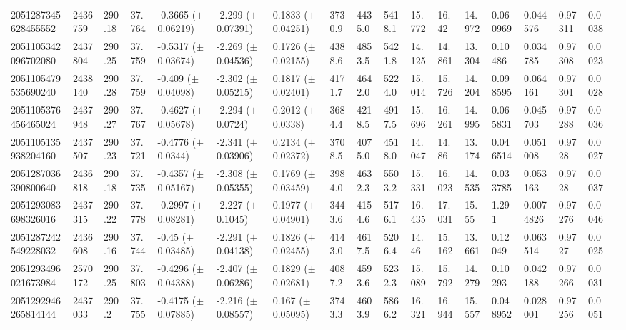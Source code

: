 \begin{sidewaystable}[htbp]
{\begin{tabular}{llllllllllllllllll}
            2051287345628455552 & 2436759 & 290.18 & 37.764 & -0.3665 ($\pm$ 0.06219) & -2.299 ($\pm$ 0.07391) & 0.1833 ($\pm$ 0.04251) & 3730.9 & 4435.0 & 5418.1 & 15.772 & 16.42 & 14.972 & 0.060969 & 0.044576 & 0.97311 & 0.0038 & \\
            2051105342096702080 & 2437804 & 290.25 & 37.759 & -0.5317 ($\pm$ 0.03674) & -2.269 ($\pm$ 0.04536) & 0.1726 ($\pm$ 0.02155) & 4388.6 & 4853.5 & 5421.8 & 14.125 & 14.861 & 13.304 & 0.10486 & 0.034785 & 0.97308 & 0.0023 & \\
            2051105479535690240 & 2438140 & 290.28 & 37.759 & -0.409 ($\pm$ 0.04098) & -2.302 ($\pm$ 0.05215) & 0.1817 ($\pm$ 0.02401) & 4171.7 & 4642.0 & 5224.0 & 15.014 & 15.726 & 14.204 & 0.098595 & 0.064161 & 0.97301 & 0.0028 & \\
            2051105376456465024 & 2437948 & 290.27 & 37.767 & -0.4627 ($\pm$ 0.05678) & -2.294 ($\pm$ 0.0724) & 0.2012 ($\pm$ 0.0338) & 3684.4 & 4218.5 & 4917.5 & 15.696 & 16.261 & 14.995 & 0.065831 & 0.045703 & 0.97288 & 0.0036 & \\
            2051105135938204160 & 2437507 & 290.23 & 37.721 & -0.4776 ($\pm$ 0.0344) & -2.341 ($\pm$ 0.03906) & 0.2134 ($\pm$ 0.02372) & 3708.5 & 4075.0 & 4518.0 & 14.047 & 14.86 & 13.174 & 0.046514 & 0.051008 & 0.9728 & 0.0027 & \\
            2051287036390800640 & 2436818 & 290.18 & 37.735 & -0.4357 ($\pm$ 0.05167) & -2.308 ($\pm$ 0.05355) & 0.1769 ($\pm$ 0.03459) & 3984.0 & 4632.3 & 5503.2 & 15.331 & 16.023 & 14.535 & 0.033785 & 0.053163 & 0.9728 & 0.0037 & \\
            2051293083698326016 & 2437315 & 290.22 & 37.778 & -0.2997 ($\pm$ 0.08281) & -2.227 ($\pm$ 0.1045) & 0.1977 ($\pm$ 0.04901) & 3443.6 & 4154.6 & 5176.1 & 16.435 & 17.031 & 15.55 & 1.291 & 0.0074826 & 0.97276 & 0.0046 & \\
            2051287242549228032 & 2436608 & 290.16 & 37.744 & -0.45 ($\pm$ 0.03485) & -2.291 ($\pm$ 0.04138) & 0.1826 ($\pm$ 0.02455) & 4143.0 & 4617.5 & 5206.4 & 14.46 & 15.162 & 13.661 & 0.12049 & 0.063514 & 0.9727 & 0.0025 & \\
            2051293496021673984 & 2570172 & 290.25 & 37.803 & -0.4296 ($\pm$ 0.04388) & -2.407 ($\pm$ 0.06286) & 0.1829 ($\pm$ 0.02681) & 4087.2 & 4593.6 & 5232.3 & 15.089 & 15.792 & 14.279 & 0.10293 & 0.042188 & 0.97266 & 0.0031 & \\
            2051292946265814144 & 2437033 & 290.2 & 37.755 & -0.4175 ($\pm$ 0.07885) & -2.216 ($\pm$ 0.08557) & 0.167 ($\pm$ 0.05095) & 3743.3 & 4603.9 & 5866.2 & 16.321 & 16.944 & 15.557 & 0.048952 & 0.028001 & 0.97256 & 0.0051 & \\

\end{tabular}}
\end{sidewaystable}
